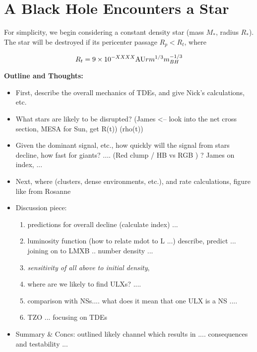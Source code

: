 \section{A Black Hole Encounters a Star}\label{section:general}


For simplicity, we begin considering a constant density star (mass $M_*$, radius $R_*$).  The star will be destroyed if its pericenter passage $R_p < R_t$, where

\begin{equation}
R_t = 9 \times 10^{-XXXX} {\rm AU} r m^{1/3} m_{BH}^{-1/3}
\end{equation}


\bf{Outline and Thoughts:}\\
\begin{itemize}
\item First, describe the overall mechanics of TDEs, and give Nick's calculations, etc. \\
\item What stars are likely to be disrupted?  (James <-- look into the net cross section, MESA for Sun, get R(t)) (rho(t)) \\
\item Given the dominant signal, etc., how quickly will the signal from stars decline, how fast for giants? .... (Red clump / HB vs RGB ) ?  James on index, ... \\ 
\item Next, where (clusters, dense environments, etc.), and rate calculations, figure like from Rosanne \\
\item Discussion piece: 
\begin{enumerate}
    \item predictions for overall decline (calculate index) ... 
    \item luminosity function (how to relate mdot to L ...) describe, predict  ... joining on to LMXB .. number density ... 
    \item {\it sensitivity of all above to initial density},  
    \item where are we likely to find ULXs? .... 
    \item comparison with NSs.... what does it mean that one ULX is a NS .... 
    \item TZO ... focusing on TDEs 
    \end{enumerate}
    
\item Summary & Concs: outlined likely channel which results in .... consequences and testability ... 
\end{itemize}







